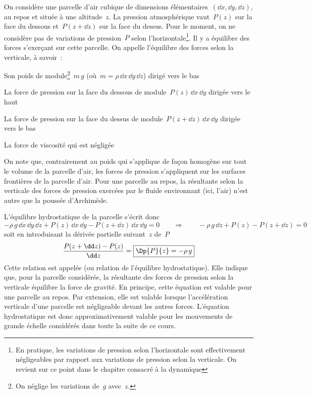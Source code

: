 \sk
On considère une parcelle d'air cubique de dimensions élémentaires~$(\dd x,\dd y, \dd z)$, au repos et située à une altitude~$z$. La pression atmosphérique vaut~$P(z)$ sur la face du dessous et~$P(z+\dd z)$ sur la face du dessus. Pour le moment, on ne considère pas de variations de pression~$P$ selon l'horizontale\footnote{En pratique, les variations de pression selon l'horizontale sont effectivement négligeables par rapport aux variations de pression selon la verticale. On revient sur ce point dans le chapitre consacré à la dynamique}. Il y a équilibre des forces s'exerçant sur cette parcelle. On appelle  l'équilibre des forces selon la verticale, à savoir~:
\begin{citemize}
\item Son poids de module\footnote{On néglige les variations de~$g$ avec~$z$.}~$m \, g$ (où~$m = \rho \, \dd x \, \dd y \, \dd z$) dirigé vers le bas
\item La force de pression sur la face du dessous de module~$P(z) \, \dd x \, \dd y$ dirigée vers le haut
\item La force de pression sur la face du dessus de module~$P(z+\dd z) \, \dd x \, \dd y$ dirigée vers le bas
\item La force de viscosité qui est négligée
\end{citemize}
On note que, contrairement au poids qui s'applique de façon homogène sur tout le volume de la parcelle d'air, les forces de pression s'appliquent sur les surfaces frontières de la parcelle d'air. 
Pour une parcelle au repos, la résultante selon la verticale des forces de pression exercées par le fluide environnant (ici, l'air) n'est autre que la poussée d'Archimède.

\sk
L'équilibre hydrostatique de la parcelle s'écrit donc
\[ - \rho \, g \, \dd x \, \dd y \, \dd z + P(z) \, \dd x \, \dd y - P(z+\dd z) \, \dd x \, \dd y = 0 \qquad \Rightarrow \qquad - \rho \, g \, \dd z + P(z) - P(z+\dd z) = 0 \]
soit en introduisant la dérivée partielle suivant~$z$ de~$P$
\[ \frac{P(z+\dd z) - P(z)}{\dd z} = \boxed{ \Dp{P}{z} = - \rho \, g } \]
Cette relation est appelée  (ou relation de l'équilibre hydrostatique). Elle indique que, pour la parcelle considérée, la résultante des forces de pression selon la verticale équilibre la force de gravité. En principe, cette équation est valable pour une parcelle au repos. Par extension, elle est valable lorsque l'accélération verticale d'une parcelle est négligeable devant les autres forces. L'équation hydrostatique est donc approximativement valable pour les mouvements de grande échelle considérés dans toute la suite de ce cours. 

